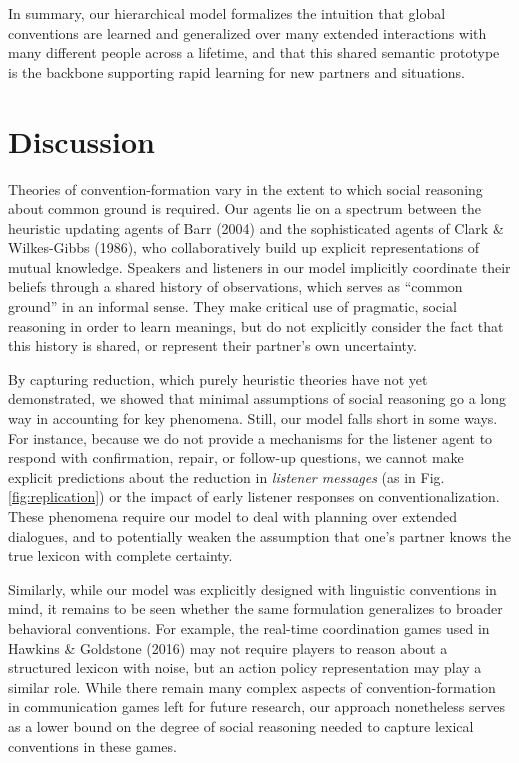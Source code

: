 In summary, our hierarchical model formalizes the intuition that global conventions are learned and generalized over many extended interactions with many different people across a lifetime, and that this shared semantic prototype is the backbone supporting rapid learning for new partners and situations. 


\section{Discussion}

Theories of convention-formation vary in the extent to which social reasoning about common ground is required. 
Our agents lie on a spectrum between the heuristic updating agents of Barr (2004) and the sophisticated agents of Clark \& Wilkes-Gibbs (1986), who collaboratively build up explicit representations of mutual knowledge. 
Speakers and listeners in our model implicitly coordinate their beliefs through a shared history of observations, which serves as ``common ground'' in an informal sense.
They make critical use of pragmatic, social reasoning in order to learn meanings, but do not explicitly consider the fact that this history is shared, or represent their partner's own uncertainty.

By capturing reduction, which purely heuristic theories have not yet demonstrated, we showed that minimal assumptions of social reasoning go a long way in accounting for key phenomena. 
Still, our model falls short in some ways. 
For instance, because we do not provide a mechanisms for the listener agent to respond with confirmation, repair, or follow-up questions, we cannot make explicit predictions about the reduction in \emph{listener messages} (as in Fig. \ref{fig:replication}) or the impact of early listener responses on conventionalization. 
These phenomena require our model to deal with planning over extended dialogues, and to potentially weaken the assumption that one's partner knows the true lexicon with complete certainty. 

Similarly, while our model was explicitly designed with linguistic conventions in mind, it remains to be seen whether the same formulation generalizes to broader behavioral conventions. 
For example, the real-time coordination games used in Hawkins \& Goldstone (2016) may not require players to reason about a structured lexicon with noise, but an action policy representation may play a similar role. 
While there remain many complex aspects of convention-formation in communication games left for future research, our approach nonetheless serves as a lower bound on the degree of social reasoning needed to capture lexical conventions in these games.
